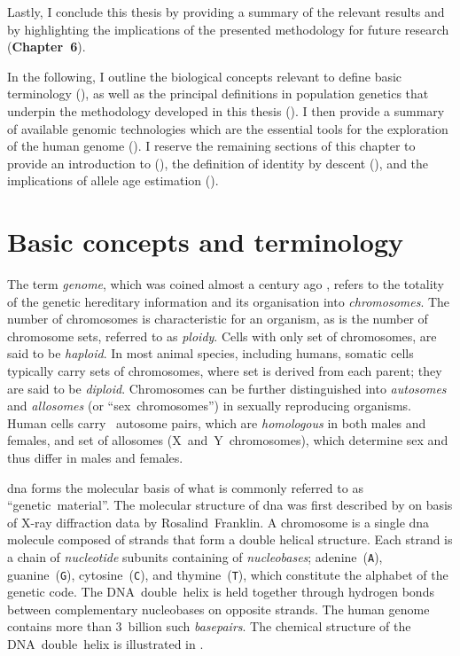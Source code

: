 Lastly, I conclude this thesis by providing a summary of the relevant results and by highlighting the implications of the presented methodology for future research (\textbf{Chapter~6}).



In the following, I outline the biological concepts relevant to define basic terminology (), as well as the principal definitions in population genetics that underpin the methodology developed in this thesis ().
I then provide a summary of available genomic technologies which are the essential tools for the exploration of the human genome ().
I reserve the remaining sections of this chapter to provide an introduction to  (), the definition of identity by descent (), and the implications of allele age estimation ().



%
\section{Basic concepts and terminology}
\label{sec:basics}
%

The term \emph{genome}, which was coined almost a century ago \citep{Winkler1920}, refers to the totality of the genetic hereditary information and its organisation into \emph{chromosomes}.
The number of chromosomes is characteristic for an organism, as is the number of chromosome sets, referred to as \emph{ploidy}.
Cells with only  set of chromosomes, are said to be \emph{haploid}.
In most animal species, including humans, somatic cells typically carry  sets of chromosomes, where  set is derived from each parent; \ie they are said to be \emph{diploid}.
Chromosomes can be further distinguished into \emph{autosomes} and \emph{allosomes} (or ``sex~chromosomes'') in sexually reproducing organisms.
Human cells carry ~autosome pairs, which are \emph{homologous} in both males and females, and  set of allosomes (X~and~Y~chromosomes), which determine sex and thus differ in males and females.

\Gls{dna} forms the molecular basis of what is commonly referred to as ``genetic~material''.
The molecular structure of \gls{dna} was first described by \citet{Watson:1953ug} on basis of X-ray diffraction data by Rosalind~Franklin.
A chromosome is a single \gls{dna} molecule composed of  strands that form a double helical structure.
Each strand is a chain of \emph{nucleotide} subunits containing  of  \emph{nucleobases}; adenine~(\texttt{A}), guanine~(\texttt{G}), cytosine~(\texttt{C}), and thymine~(\texttt{T}), which constitute the alphabet of the genetic code.
The DNA~double~helix is held together through hydrogen bonds between complementary nucleobases on opposite strands.
The human genome contains more than 3~billion such \emph{basepairs}.
The chemical structure of the DNA~double~helix is illustrated in .

